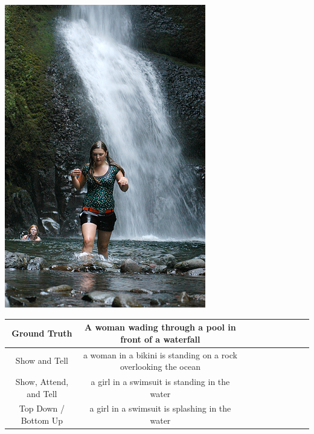 \documentclass[a4paper]{article}
\begin{document}
\includegraphics[width=\textwidth]{219301555_17883a51bd.jpg}
\\
\begin{center}
 \begin{tabular}{|c| c| c| c| c| c| c | c| c| c|} 
 \hline
 
 Ground Truth & A woman wading through a pool in front of a waterfall\\ [0.2ex] 
 \hline
  Show and Tell & a woman in a bikini is standing on a rock overlooking the ocean\\ 
 \hline
	Show, Attend, and Tell &  a girl in a swimsuit is standing in the water\\
 \hline
  Top Down / Bottom Up & a girl in a swimsuit is splashing in the water\\ 
 \hline
\end{tabular}
\end{center}
\end{document}

